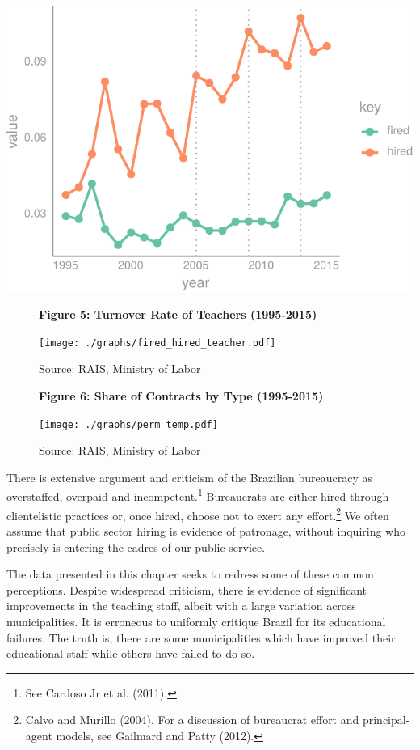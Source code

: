 \documentclass[12pt,]{article}
\let\rmarkdownfootnote\footnote%
\def\footnote{\protect\rmarkdownfootnote}
\begin{document}
\begin{center}\includegraphics{dissertation_files/figure-latex/unnamed-chunk-22-1} \end{center}

\begin{figure}
    \centering
    \textbf{\small Figure 5: Turnover Rate of Teachers (1995-2015)}\par\medskip
    \texttt{[image: ./graphs/fired\_hired\_teacher.pdf]}
    \caption*{\footnotesize \hfill Source: RAIS, Ministry of Labor}
\end{figure}

\begin{figure}
    \centering
    \textbf{\small Figure 6: Share of Contracts by Type (1995-2015)}\par\medskip
    \texttt{[image: ./graphs/perm\_temp.pdf]}
    \caption*{\footnotesize \hfill Source: RAIS, Ministry of Labor}
\end{figure}

There is extensive argument and criticism of the Brazilian bureaucracy
as overstaffed, overpaid and incompetent.\footnote{See Cardoso Jr et al.
  (2011).} Bureaucrats are either hired through clientelistic practices
or, once hired, choose not to exert any effort.\footnote{Calvo and
  Murillo (2004). For a discussion of bureaucrat effort and
  principal-agent models, see Gailmard and Patty (2012).} We often
assume that public sector hiring is evidence of patronage, without
inquiring who precisely is entering the cadres of our public service.

The data presented in this chapter seeks to redress some of these common
perceptions. Despite widespread criticism, there is evidence of
significant improvements in the teaching staff, albeit with a large
variation across municipalities. It is erroneous to uniformly critique
Brazil for its educational failures. The truth is, there are some
municipalities which have improved their educational staff while others
have failed to do so.
\end{document}
